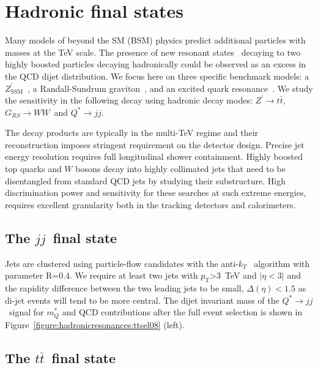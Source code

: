 \documentclass[a4paper,11pt]{article}
\newcommand{\ZpSSM}{\ensuremath{Z^{\prime}_{\mathrm{SSM}}}}
\newcommand*{\Zptt}{\ensuremath{Z^{\prime} \rightarrow \ttbar}}
\newcommand{\pt}{\ensuremath{p_{\text{T}}}}
\newcommand*{\qjj}{\ensuremath{Q^{*} \rightarrow jj}}
\newcommand*{\rsg}{\ensuremath{G_{RS} \rightarrow WW}}
\newcommand*{\ttbar}{\ensuremath{t\bar{t}}}
\newcommand*{\jj}{\ensuremath{jj}}
\begin{document}
\section{Hadronic final states}
\label{sec:hadronic}

Many models of beyond the SM (BSM) physics predict additional particles with masses at the TeV scale. The presence of new resonant states~\cite{Harris:2011bh,Boelaert:2009jm,Lee:1973iz,Branco:2011iw,Hill:1994hp,Kaplan:1983sm,Bellazzini:2014yua,Randall:1999ee,Pomarol:1999ad,Davoudiasl:1999tf} decaying to two highly boosted particles decaying hadronically could be observed as an excess in the QCD dijet distribution. We focus here on three specific benchmark models: a \ZpSSM~\cite{Langacker:2008yv}, a Randall-Sundrum graviton~\cite{Randall:1999ee}, and an excited quark resonance~\cite{Baur:1987ga,Baur:1989kv}. We study the sensitivity in the following decay using hadronic decay modes: \Zptt, \rsg\ and \qjj.

The decay products are typically in the multi-TeV regime and their reconstruction imposes stringent requirement on the detector design. Precise jet energy resolution requires full longitudinal shower containment. Highly boosted top quarks and $W$ bosons decay into highly collimated jets that need to  be disentangled from standard QCD jets by studying their substructure. High discrimination power and sensitivity for these searches at such extreme energies, requires excellent granularity both in the tracking detectors and calorimeters.


\subsection{The \jj\ final state}
\label{sec:hadjj}

Jets are clustered using particle-flow candidates with the anti-$k_T$~\cite{Cacciari:2008gp} algorithm with parameter R=0.4. We require at least two jets with $\pt$>3~TeV and $|\eta<3|$ and the rapidity difference between the two leading jets to be small, $\Delta(\eta)<1.5$ as di-jet events will tend to be more central. The dijet invariant mass of the \qjj\ signal for $m_Q^{*}$ and QCD contributions after the full event selection is shown in Figure~\ref{figure:hadronicresonances:ttsel08} (left).


\subsection{The \ttbar\ final state}
\label{sec:hadtt}
\end{document}
